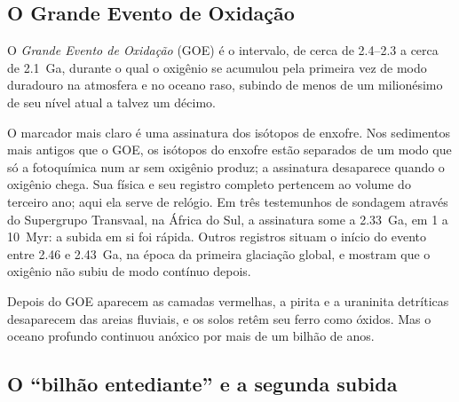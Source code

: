 \subsection*{O Grande Evento de Oxidação}

\begin{definition}\label{def:b2:precambrian-earth:goe}
O \emph{Grande Evento de Oxidação} (GOE) é o intervalo, de cerca de
2.4--2.3 a cerca de \qty{2.1}{Ga}, durante o qual o oxigênio se acumulou pela primeira vez de modo duradouro na
atmosfera e no oceano raso, subindo de menos de um milionésimo de seu nível atual a
talvez um décimo.
\end{definition}

O marcador mais claro é uma assinatura dos isótopos de enxofre. Nos sedimentos mais antigos que o GOE, os
isótopos do enxofre estão separados de um modo que só a fotoquímica num ar sem oxigênio
produz; a assinatura desaparece quando o oxigênio chega. Sua física e seu registro completo pertencem
ao volume do terceiro ano; aqui ela serve de relógio. Em três testemunhos de sondagem através do Supergrupo
Transvaal, na África do Sul, a assinatura some a \qty{2.33}{Ga}, em 1 a \qty{10}{Myr}:
a subida em si foi rápida. Outros registros situam o início do evento entre 2.46 e \qty{2.43}{Ga},
na época da primeira glaciação global, e mostram que o oxigênio não subiu de modo contínuo
depois.

Depois do GOE aparecem as camadas vermelhas, a pirita e a uraninita detríticas desaparecem das areias fluviais,
e os solos retêm seu ferro como óxidos. Mas o oceano profundo continuou anóxico por mais de um bilhão
de anos.

\subsection*{O ``bilhão entediante'' e a segunda subida}

